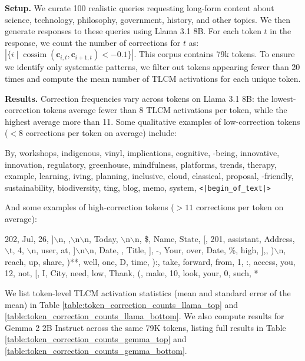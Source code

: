 \textbf{Setup.} We curate 100 realistic queries requesting long-form content about science, technology, philosophy, government, history, and other topics. We then generate responses to these queries using Llama 3.1 8B. For each token $t$ in the response, we count the number of corrections for $t$ as: $|\{i \mid \operatorname{cossim}(\mathbf{c}_{i,t}, \mathbf{c}_{i+1,t}) < -0.1\}|$. This corpus contains 79k tokens. To ensure we identify only systematic patterns, we filter out tokens appearing fewer than 20 times and compute the mean number of TLCM activations for each unique token. 

\textbf{Results.} Correction frequencies vary across tokens on Llama 3.1 8B: the lowest-correction tokens average fewer than 8 TLCM activations per token, while the highest average more than 11. Some qualitative examples of low-correction tokens ($<8$ corrections per token on average) include:
\begin{examplebox}
By,  workshops,  indigenous,  vinyl,  implications,  cognitive, -being,  innovative,  innovation,  regulatory,  greenhouse,  mindfulness,  platforms,  trends,  therapy,  example,  learning, iving,  planning,  inclusive,  cloud,  classical,  proposal, -friendly,  sustainability,  biodiversity, ting,  blog,  memo, system, \texttt{<|begin\_of\_text|>}
\end{examplebox}

And some examples of high-correction tokens ($>11$ corrections per token on average):
\begin{examplebox}
202,  Jul, 26, ]$\backslash$n, ,$\backslash$n$\backslash$n, Today, $\backslash$n$\backslash$n,  \$,  Name,  State, [, 201, assistant,  Address, $\backslash$t, 4, $\backslash$n, user,  at, ]$\backslash$n$\backslash$n,  Date,    ,  Title, ], -, Your,  over, Date, \%,  high, ],, )$\backslash$n,  reach,  up,  share, )**,  well,  one,  D,  time, ):,  take,  forward,  from, 1, :,  access,  you, 12,  not,  [, I, City,  need,  low, Thank,  (,  make, 10,  look,  your, 0,  such,  *
\end{examplebox}

We list token-level TLCM activation statistics (mean and standard error of the mean) in Table \ref{table:token_correction_counts_llama_top} and \ref{table:token_correction_counts_llama_bottom}. We also compute results for Gemma 2 2B Instruct across the same 79K tokens, listing full results in Table \ref{table:token_correction_counts_gemma_top} and \ref{table:token_correction_counts_gemma_bottom}.


